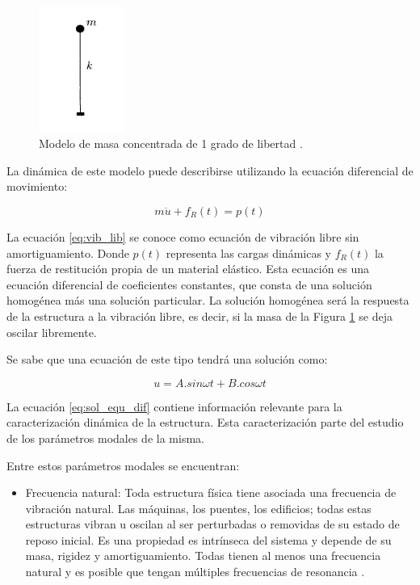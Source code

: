 \begin{itemize}
    \begin{figure}[H]
        \centering
        \includegraphics[width = 0.25\textwidth]{imagenes/cap1_marcoteo/modelo_masa_simple.png}
        \caption{Modelo de masa concentrada de 1 grado de libertad \citep{hurtado2000}.}
        \label{fig:masa_estructural}
    \end{figure}

    La dinámica de este modelo puede describirse utilizando la ecuación diferencial de movimiento:

    \begin{equation} \label{eq:vib_lib}
        m\ddot{u} + f_R(t) = p(t)
    \end{equation}

    La ecuación \ref{eq:vib_lib} se conoce como ecuación de vibración libre sin amortiguamiento. Donde $p(t)$ representa las cargas dinámicas y $f_R(t)$ la fuerza de restitución propia de un material elástico.  Esta ecuación es una ecuación diferencial de coeficientes constantes, que consta de una solución homogénea más una solución particular. La solución homogénea será la respuesta de la estructura a la vibración libre, es decir, si la masa de la Figura \ref{fig:masa_estructural} se deja oscilar libremente.

    Se sabe que una ecuación de este tipo tendrá una solución como:

    \begin{equation} \label{eq:sol_equ_dif}
        u = A.sin\omega t + B.cos\omega t
    \end{equation}

    La ecuación \ref{eq:sol_equ_dif} contiene información relevante para la caracterización dinámica de la estructura. Esta caracterización parte del estudio de los parámetros modales de la misma.

    Entre estos parámetros modales se encuentran: 
        \begin{itemize}
            \item Frecuencia natural: Toda estructura física tiene asociada una frecuencia de vibración natural. Las máquinas, los puentes, los edificios; todas estas estructuras vibran u oscilan al ser perturbadas o removidas de su estado de reposo inicial. Es una propiedad es intrínseca del sistema y depende de su masa, rigidez y amortiguamiento. Todas tienen al menos una frecuencia natural y es posible que tengan múltiples frecuencias de resonancia \citep{irvine2000introduction}. 
            

\end{itemize}
\end{itemize}
